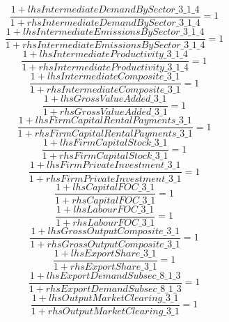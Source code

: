 \begin{dmath}
\frac{1+{lhsIntermediateDemandBySector\_3\_1\_4}}{1+{rhsIntermediateDemandBySector\_3\_1\_4}}=1
\end{dmath}
\begin{dmath}
\frac{1+{lhsIntermediateEmissionsBySector\_3\_1\_4}}{1+{rhsIntermediateEmissionsBySector\_3\_1\_4}}=1
\end{dmath}
\begin{dmath}
\frac{1+{lhsIntermediateProductivity\_3\_1\_4}}{1+{rhsIntermediateProductivity\_3\_1\_4}}=1
\end{dmath}
\begin{dmath}
\frac{1+{lhsIntermediateComposite\_3\_1}}{1+{rhsIntermediateComposite\_3\_1}}=1
\end{dmath}
\begin{dmath}
\frac{1+{lhsGrossValueAdded\_3\_1}}{1+{rhsGrossValueAdded\_3\_1}}=1
\end{dmath}
\begin{dmath}
\frac{1+{lhsFirmCapitalRentalPayments\_3\_1}}{1+{rhsFirmCapitalRentalPayments\_3\_1}}=1
\end{dmath}
\begin{dmath}
\frac{1+{lhsFirmCapitalStock\_3\_1}}{1+{rhsFirmCapitalStock\_3\_1}}=1
\end{dmath}
\begin{dmath}
\frac{1+{lhsFirmPrivateInvestment\_3\_1}}{1+{rhsFirmPrivateInvestment\_3\_1}}=1
\end{dmath}
\begin{dmath}
\frac{1+{lhsCapitalFOC\_3\_1}}{1+{rhsCapitalFOC\_3\_1}}=1
\end{dmath}
\begin{dmath}
\frac{1+{lhsLabourFOC\_3\_1}}{1+{rhsLabourFOC\_3\_1}}=1
\end{dmath}
\begin{dmath}
\frac{1+{lhsGrossOutputComposite\_3\_1}}{1+{rhsGrossOutputComposite\_3\_1}}=1
\end{dmath}
\begin{dmath}
\frac{1+{lhsExportShare\_3\_1}}{1+{rhsExportShare\_3\_1}}=1
\end{dmath}
\begin{dmath}
\frac{1+{lhsExportDemandSubsec\_8\_1\_3}}{1+{rhsExportDemandSubsec\_8\_1\_3}}=1
\end{dmath}
\begin{dmath}
\frac{1+{lhsOutputMarketClearing\_3\_1}}{1+{rhsOutputMarketClearing\_3\_1}}=1
\end{dmath}
